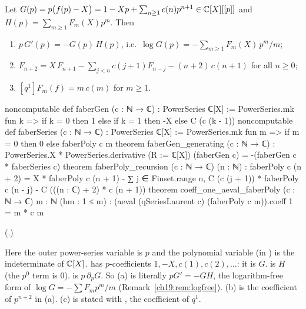 \begin{theorem}\label{ch19:thm:fabergen}
Let $G(p)=p\bigl(f(p)-X\bigr)=1-Xp+\sum_{n\ge1}c(n)p^{n+1}\in{\mathbb{C}}[X][[p]]$ and $H(p)=\sum_{m\ge1}F_m(X)p^m$.  Then
\begin{enumerate}[label=(\alph*)]
\item $p\,G'(p)=-G(p)\,H(p)$, i.e.\ $\log G(p)=-\sum_{m\ge1}F_m(X)\,p^m/m$;
\item $F_{n+2}=X\,F_{n+1}-\sum_{j<n}c(j+1)F_{n-j}-(n+2)\,c(n+1)$ for all $n\ge0$;
\item $[q^1]F_m(f)=m\,c(m)$ for $m\ge1$.
\end{enumerate}
\end{theorem}
\begin{leancode}
noncomputable def faberGen (c : ℕ → ℂ) : PowerSeries ℂ[X] :=
  PowerSeries.mk fun k => if k = 0 then 1 else if k = 1 then -X else C (c (k - 1))
noncomputable def faberSeries (c : ℕ → ℂ) : PowerSeries ℂ[X] :=
  PowerSeries.mk fun m => if m = 0 then 0 else faberPoly c m
theorem faberGen_generating (c : ℕ → ℂ) :
    PowerSeries.X * PowerSeries.derivative (R := ℂ[X]) (faberGen c) =
      -(faberGen c * faberSeries c)
theorem faberPoly_recursion (c : ℕ → ℂ) (n : ℕ) :
    faberPoly c (n + 2) =
      X * faberPoly c (n + 1) - ∑ j ∈ Finset.range n, C (c (j + 1)) * faberPoly c (n - j) -
        C (((n : ℂ) + 2) * c (n + 1))
theorem coeff_one_aeval_faberPoly (c : ℕ → ℂ) {m : ℕ} (hm : 1 ≤ m) :
    (aeval (qSeriesLaurent c) (faberPoly c m)).coeff 1 = m * c m
\end{leancode}
(.)
\begin{dictionary}
Here the outer power-series variable  is $p$ and the polynomial variable  (in )
is the indeterminate of ${\mathbb{C}}[X]$.   has $p$-coefficients $1,-X,c(1),c(2),\dots$: it is $G$.
 is $H$ (the $p^0$ term is $0$).  
is $p\,\partial_pG$.  So (a) is literally $pG'=-GH$, the logarithm-free form of $\log G=-\sum F_mp^m/m$
(Remark~\ref{ch19:rem:logfree}).  (b) is the coefficient of $p^{n+2}$ in (a).  (c) is stated with , the
coefficient of $q^1$.
\end{dictionary}
